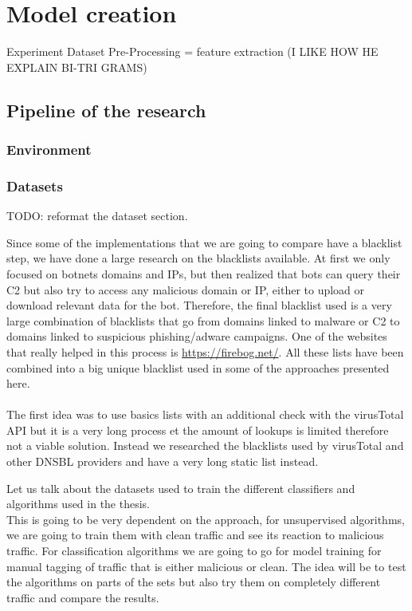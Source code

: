 
\chapter{Model creation} %

\label{Model creation}
Experiment Dataset Pre-Processing = feature extraction (I LIKE HOW HE EXPLAIN BI-TRI GRAMS)
\section{Pipeline of the research}
\subsection{Environment}
\subsection{Datasets}
TODO: reformat the dataset section.

Since some of the implementations that we are going to compare have a blacklist step, we have done a large research on the blacklists available. At first we only focused on botnets domains and IPs, but then realized that bots can query their C2 but also try to access any malicious domain or IP, either to upload or download relevant data for the bot. Therefore, the final blacklist used is a very large combination of blacklists that go from domains linked to malware or C2 to domains linked to suspicious phishing/adware campaigns. One of the websites that really helped in this process is \url{https://firebog.net/}. All these lists have been combined into a big unique blacklist used in some of the approaches presented here.\\\\

The first idea was to use basics lists with an additional check with the virusTotal API but it is a very long process et the amount of lookups is limited therefore not a viable solution. Instead we researched the blacklists used by virusTotal and other DNSBL providers and have a very long static list instead.


Let us talk about the datasets used to train the different classifiers and algorithms used in the thesis.\\
This is going to be very dependent on the approach, for unsupervised algorithms, we are going to train them with clean traffic and see its reaction to malicious traffic. For classification algorithms we are going to go for model training for manual tagging of traffic that is either malicious or clean.
The idea will be to test the algorithms on parts of the sets but also try them on completely different traffic and compare the results.
\\

